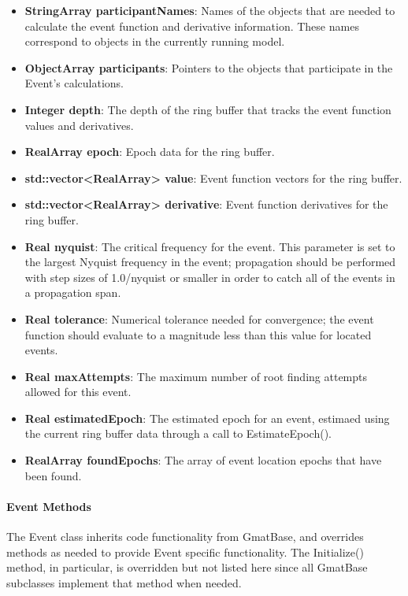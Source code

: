 \begin{itemize}
\item \textbf{StringArray participantNames}:  Names of the objects that are needed to calculate the event function and derivative information.  These names correspond to objects in the currently running model.
\item \textbf{ObjectArray participants}:  Pointers to the objects that participate in the Event's calculations.
\item \textbf{Integer depth}:  The depth of the ring buffer that tracks the event function values and derivatives.
\item \textbf{RealArray epoch}:  Epoch data for the ring buffer.
\item \textbf{std::vector<RealArray> value}:  Event function vectors for the ring buffer.
\item \textbf{std::vector<RealArray> derivative}:  Event function derivatives for the ring buffer.
\item \textbf{Real nyquist}:  The critical frequency for the event.  This parameter is set to the largest Nyquist frequency in the event; propagation should be performed with step sizes of 1.0/nyquist or smaller in order to catch all of the events in a propagation span.
\item \textbf{Real tolerance}: Numerical tolerance needed for convergence; the event function should evaluate to a magnitude less than this value for located events.
\item \textbf{Real maxAttempts}:  The maximum number of root finding attempts allowed for this event.
\item \textbf{Real estimatedEpoch}:  The estimated epoch for an event, estimaed using the current ring buffer data through a call to EstimateEpoch().
\item \textbf{RealArray foundEpochs}:  The array of event location epochs that have been found.
\end{itemize}

\paragraph{Event Methods}  The Event class inherits code functionality from GmatBase, and
overrides methods as needed to provide Event specific functionality.  The Initialize() method, in particular, is overridden but not listed here since all GmatBase subclasses implement that method when needed.

